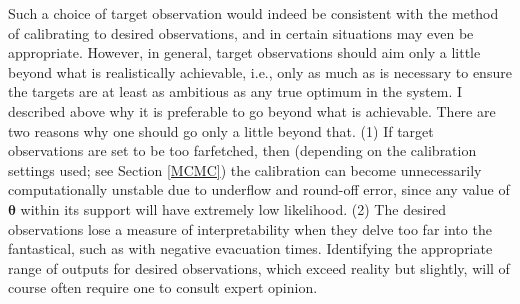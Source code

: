 \documentclass{article}
\begin{document}
Such a choice of target observation would indeed be consistent with the method of calibrating to desired observations, and in certain situations may even be appropriate. However, in general, target observations should aim only a little beyond what is realistically achievable, i.e., only as much as is necessary to ensure the targets are at least as ambitious as any true optimum in the system. I described above why it is preferable to go beyond what is achievable. There are two reasons why one should go only a little beyond that. (1) If target observations are set to be too farfetched, then (depending on the calibration settings used; see Section \ref{MCMC}) the calibration can become unnecessarily computationally unstable due  to underflow and round-off error, since any value of $\boldsymbol \theta$ within its support will have extremely low likelihood.
(2) The desired observations lose a measure of interpretability when they delve too far into the fantastical, such as with negative evacuation times. Identifying the appropriate range of outputs for desired observations, which exceed reality but slightly, will of course often require one to consult expert opinion. 

\end{document}
